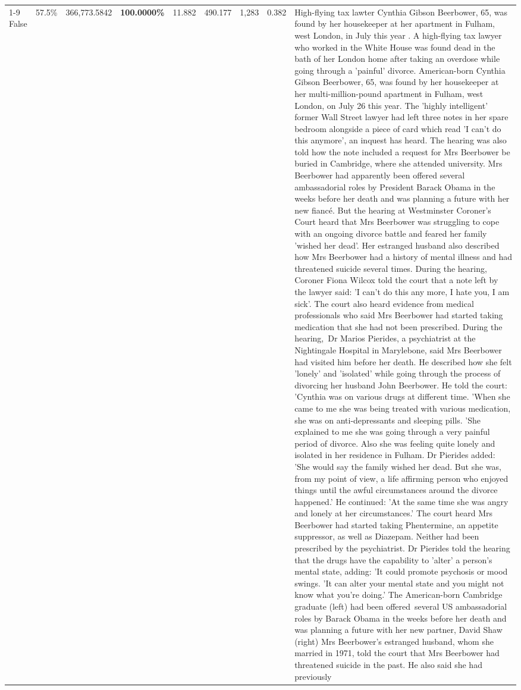 \begin{table}[H]
\begin{tabular}{lllrlllll}
\cline{1-9}
False & 57.5\% & 366,773.5842 & \bfseries \color{red} 100.0000\% & 11.882 & 490.177 & 1,283 & 0.382 & High-flying tax lawter Cynthia Gibson Beerbower, 65, was found by her housekeeper at her apartment in Fulham, west London, in July this year . A high-flying tax lawyer who worked in the White House was found dead in the bath of her London home after taking an overdose while going through a 'painful' divorce. American-born Cynthia Gibson Beerbower, 65, was found by her housekeeper at her multi-million-pound apartment in Fulham, west London, on July 26 this year. The 'highly intelligent' former Wall Street lawyer had left three notes in her spare bedroom alongside a piece of card which read 'I can't do this anymore', an inquest has heard. The hearing was also told how the note included a request for Mrs Beerbower be buried in Cambridge, where she attended university. Mrs Beerbower had apparently been offered several ambassadorial roles by President Barack Obama in the weeks before her death and was planning a future with her new fiancé. But the hearing at Westminster Coroner's Court heard that Mrs Beerbower was struggling to cope with an ongoing divorce battle and feared her family 'wished her dead'. Her estranged husband also described how Mrs Beerbower had a history of mental illness and had threatened suicide several times. During the hearing, Coroner Fiona Wilcox told the court that a note left by the lawyer said: 'I can't do this any more, I hate you, I am sick'. The court also heard evidence from medical professionals who said Mrs Beerbower had started taking medication that she had not been prescribed. During the hearing, Dr Marios Pierides, a psychiatrist at the Nightingale Hospital in Marylebone, said Mrs Beerbower had visited him before her death. He described how she felt 'lonely' and 'isolated' while going through the process of divorcing her husband John Beerbower. He told the court: 'Cynthia was on various drugs at different time. 'When she came to me she was being treated with various medication, she was on anti-depressants and sleeping pills. 'She explained to me she was going through a very painful period of divorce. Also she was feeling quite lonely and isolated in her residence in Fulham. Dr Pierides added: 'She would say the family wished her dead. But she was, from my point of view, a life affirming person who enjoyed things until the awful circumstances around the divorce happened.' He continued: 'At the same time she was angry and lonely at her circumstances.' The court heard Mrs Beerbower had started taking Phentermine, an appetite suppressor, as well as Diazepam. Neither had been prescribed by the psychiatrist. Dr Pierides told the hearing that the drugs have the capability to 'alter' a person's mental state, adding: 'It could promote psychosis or mood swings. 'It can alter your mental state and you might not know what you're doing.' The American-born Cambridge graduate (left) had been offered several US ambassadorial roles by Barack Obama in the weeks before her death and was planning a future with her new partner, David Shaw (right) Mrs Beerbower's estranged husband, whom she married in 1971, told the court that Mrs Beerbower had threatened suicide in the past. He also said she had previously 
\end{tabular}
\end{table}
